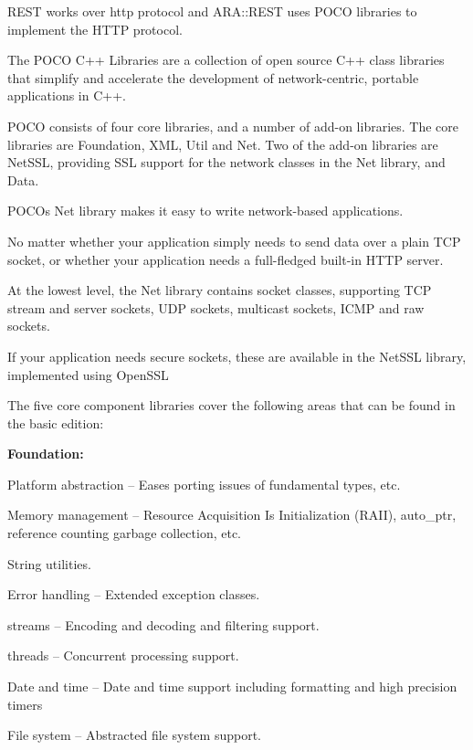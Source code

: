 \begin{DoxyItemize}
\item R\+E\+ST works over http protocol and A\+R\+A\+::\+R\+E\+ST uses P\+O\+CO libraries to implement the H\+T\+TP protocol.
\item The P\+O\+CO C++ Libraries are a collection of open source C++ class libraries that simplify and accelerate the development of network-\/centric, portable applications in C++.
\item P\+O\+CO consists of four core libraries, and a number of add-\/on libraries. The core libraries are Foundation, X\+ML, Util and Net. Two of the add-\/on libraries are Net\+S\+SL, providing S\+SL support for the network classes in the Net library, and Data.
\item P\+O\+CO\textquotesingle{}s Net library makes it easy to write network-\/based applications.
\item No matter whether your application simply needs to send data over a plain T\+CP socket, or whether your application needs a full-\/fledged built-\/in H\+T\+TP server.
\item At the lowest level, the Net library contains socket classes, supporting T\+CP stream and server sockets, U\+DP sockets, multicast sockets, I\+C\+MP and raw sockets.
\item If your application needs secure sockets, these are available in the Net\+S\+SL library, implemented using Open\+S\+SL 
\item The five core component libraries cover the following areas that can be found in the basic edition\+:
\begin{DoxyItemize}
\item {\bfseries Foundation\+:}
\begin{DoxyItemize}
\item Platform abstraction – Eases porting issues of fundamental types, etc.
\item Memory management – Resource Acquisition Is Initialization (R\+A\+II), auto\+\_\+ptr, reference counting garbage collection, etc.
\item String utilities.
\item Error handling – Extended exception classes.
\item streams – Encoding and decoding and filtering support.
\item threads – Concurrent processing support.
\item Date and time – Date and time support including formatting and high precision timers
\item File system – Abstracted file system support.

\end{DoxyItemize}
\end{DoxyItemize}
\end{DoxyItemize}
